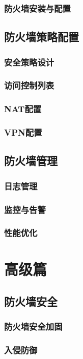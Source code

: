 \documentclass[12pt,UTF8]{ctexbook}
\begin{document}
\section{防火墙安装与配置}

\chapter{防火墙策略配置}
\section{安全策略设计}
\section{访问控制列表}
\section{NAT配置}
\section{VPN配置}

\chapter{防火墙管理}
\section{日志管理}
\section{监控与告警}
\section{性能优化}

\part{高级篇}
\chapter{防火墙安全}
\section{防火墙安全加固}
\section{入侵防御}
\end{document}
